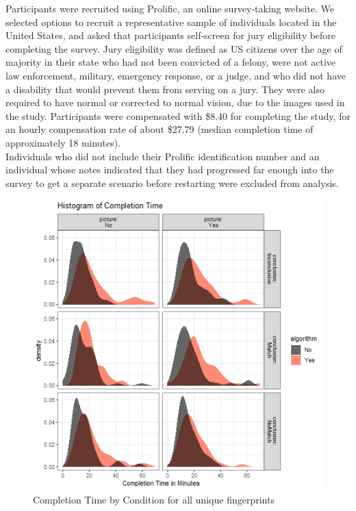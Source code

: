 \documentclass[print]{nuthesis}
\begin{document}
Participants were recruited using Prolific, an online survey-taking website.
We selected options to recruit a representative sample of individuals located in the United States, and asked that participants self-screen for jury eligibility before completing the survey.
Jury eligibility was defined as US citizens over the age of majority in their state who had not been convicted of a felony, were not active law enforcement, military, emergency response, or a judge, and who did not have a disability that would prevent them from serving on a jury.
They were also required to have normal or corrected to normal vision, due to the images used in the study.
Participants were compensated with \$8.40 for completing the study, for an hourly compensation rate of about \$27.79 (median completion time of approximately 18 minutes).\\
Individuals who did not include their Prolific identification number and an individual whose notes indicated that they had progressed far enough into the survey to get a separate scenario before restarting were excluded from analysis.

\begin{figure}

{\centering \includegraphics[width=\linewidth]{images/completiontime} 

}

\caption{Completion Time by Condition for all unique fingerprints}\label{fig:completiontime}
\end{figure}
\end{document}
